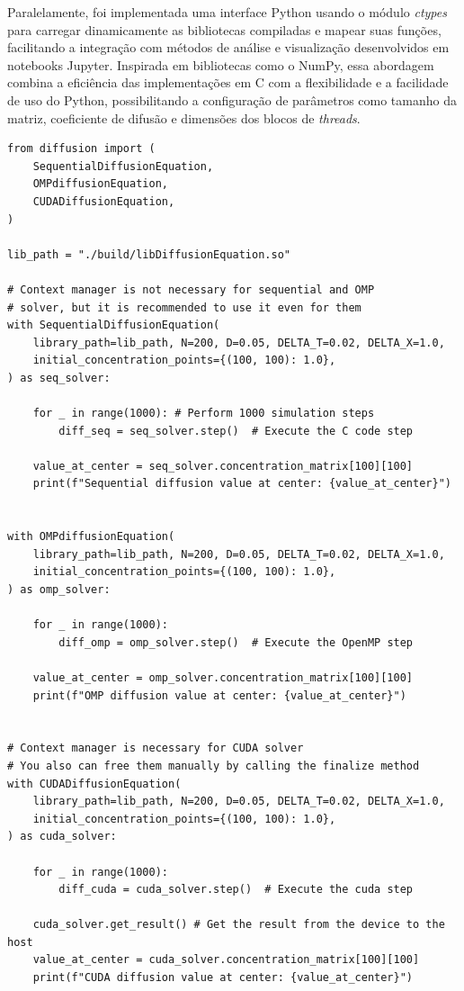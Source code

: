\documentclass[12pt]{article}
\begin{document}
Paralelamente, foi implementada uma interface Python usando o módulo
\textit{ctypes} para carregar dinamicamente as bibliotecas compiladas e mapear
suas funções, facilitando a integração com métodos de análise e visualização
desenvolvidos em notebooks Jupyter. Inspirada em bibliotecas como o NumPy, essa
abordagem combina a eficiência das implementações em C com a flexibilidade e a
facilidade de uso do Python, possibilitando a configuração de parâmetros como
tamanho da matriz, coeficiente de difusão e dimensões dos blocos de
\textit{threads}.

\begin{lstlisting}[style=PythonStyle, caption={Implementação paralelizada utilizando CUDA.}, label={cod:pythonlib}]
from diffusion import (
    SequentialDiffusionEquation,
    OMPdiffusionEquation,
    CUDADiffusionEquation,
)

lib_path = "./build/libDiffusionEquation.so"

# Context manager is not necessary for sequential and OMP
# solver, but it is recommended to use it even for them
with SequentialDiffusionEquation(
    library_path=lib_path, N=200, D=0.05, DELTA_T=0.02, DELTA_X=1.0,
    initial_concentration_points={(100, 100): 1.0},
) as seq_solver:

    for _ in range(1000): # Perform 1000 simulation steps
        diff_seq = seq_solver.step()  # Execute the C code step
    
    value_at_center = seq_solver.concentration_matrix[100][100]
    print(f"Sequential diffusion value at center: {value_at_center}")


with OMPdiffusionEquation(
    library_path=lib_path, N=200, D=0.05, DELTA_T=0.02, DELTA_X=1.0,
    initial_concentration_points={(100, 100): 1.0},
) as omp_solver:

    for _ in range(1000):
        diff_omp = omp_solver.step()  # Execute the OpenMP step
    
    value_at_center = omp_solver.concentration_matrix[100][100]
    print(f"OMP diffusion value at center: {value_at_center}")


# Context manager is necessary for CUDA solver
# You also can free them manually by calling the finalize method
with CUDADiffusionEquation(
    library_path=lib_path, N=200, D=0.05, DELTA_T=0.02, DELTA_X=1.0,
    initial_concentration_points={(100, 100): 1.0},
) as cuda_solver:

    for _ in range(1000):
        diff_cuda = cuda_solver.step()  # Execute the cuda step
    
    cuda_solver.get_result() # Get the result from the device to the host
    value_at_center = cuda_solver.concentration_matrix[100][100]
    print(f"CUDA diffusion value at center: {value_at_center}")
\end{lstlisting}
\end{document}
